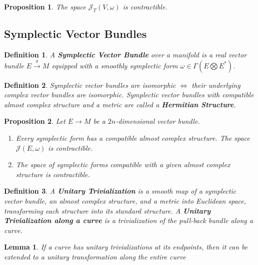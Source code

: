 \documentclass{article}
\newtheorem{defn}{Definition}
\newtheorem{prop}{Proposition}
\newtheorem{lem}{Lemma}
\begin{document}
\begin{prop}

The space $\mathcal{J}_T(V,\omega)$ is contractible.

\end{prop}

\subsection{Symplectic Vector Bundles}

\begin{defn}

A \textbf{Symplectic Vector Bundle} over a manifold is a real vector bundle $E \overset{\pi}{\to} M$ equipped with a smoothly symplectic form $\omega \in \Gamma(E \bigotimes E^*)$. 

\end{defn}

\begin{defn}

Symplectic vector bundles are isomorphic $\iff$ their underlying complex vector bundles are isomorphic. Symplectic vector bundles with compatible almost complex structure and a metric are called a \textbf{Hermitian Structure}.

\end{defn}

\begin{prop}

Let $E \to M$ be a $2n$-dimensional vector bundle.
\begin{enumerate}
    \item Every symplectic form has a compatible almost complex structure. The space $\mathcal{J}(E,\omega)$ is contractible.
    \item The space of symplectic forms compatible with a given almost complex structure is contractible.
\end{enumerate}

\end{prop}

\begin{defn}

A \textbf{Unitary Trivialization} is a smooth map of a symplectic vector bundle, an almost complex structure, and a metric into Euclidean space, transforming each structure into its standard structure. A \textbf{Unitary Trivialization along a curve} is a trivialization of the pull-back bundle along a curve.
\end{defn}

\begin{lem}

If a curve has unitary trivializations at its endpoints, then it can be extended to a unitary transformation along the entire curve

\end{lem}
\end{document}
